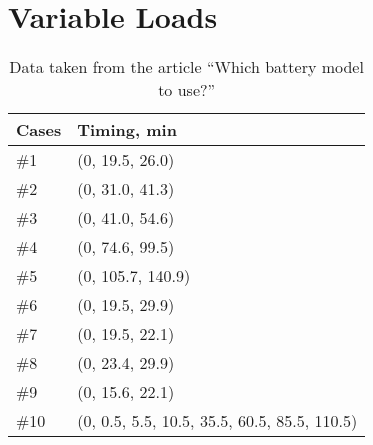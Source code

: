 \chapter{Variable Loads}\label{cp:VL}
\begin{table}[]
\centering
\begin{tabular}{|l|l|}
\hline
Cases & Timing, min \\ \hline
\rowcolor[HTML]{EFEFEF} 
\#1 & (0, 19.5, 26.0) \\ \hline
\#2 & (0, 31.0, 41.3) \\ \hline
\rowcolor[HTML]{EFEFEF} 
\#3 & (0, 41.0, 54.6) \\ \hline
\#4 & (0, 74.6, 99.5) \\ \hline
\rowcolor[HTML]{EFEFEF} 
\#5 & (0, 105.7, 140.9) \\ \hline
\#6 & (0, 19.5, 29.9) \\ \hline
\rowcolor[HTML]{EFEFEF} 
\#7 & (0, 19.5, 22.1) \\ \hline
\#8 & (0, 23.4, 29.9) \\ \hline
\rowcolor[HTML]{EFEFEF} 
\#9 & (0, 15.6, 22.1) \\ \hline
\#10 & (0, 0.5, 5.5, 10.5, 35.5, 60.5, 85.5, 110.5) \\ \hline
\end{tabular}
\caption{Data taken from the article ``Which battery model to use?'' \cite{battery_model}}
\label{table:variable_loads_list}
\end{table}